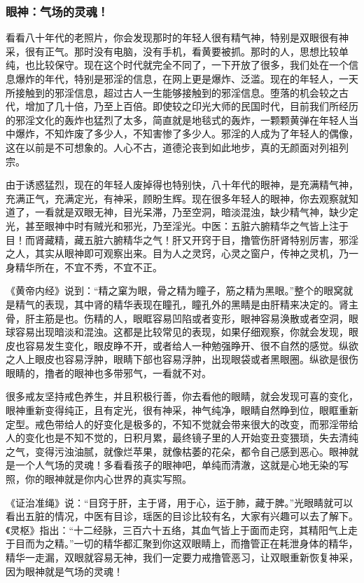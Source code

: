 \documentclass{ctexart}
\begin{document}
\subsubsection{眼神：气场的灵魂！}

看看八十年代的老照片，你会发现那时的年轻人很有精气神，特别是双眼很有神采，很有正气。那时没有电脑，没有手机，看黄要被抓。那时的人，思想比较单纯，也比较保守。现在这个时代就完全不同了，一下开放了很多，我们处在一个信息爆炸的年代，特别是邪淫的信息，在网上更是爆炸、泛滥。现在的年轻人，一天所接触到的邪淫信息，超过古人一生能够接触到的邪淫信息。堕落的机会较之古代，增加了几十倍，乃至上百倍。即使较之印光大师的民国时代，目前我们所经历的邪淫文化的轰炸也猛烈了太多，简直就是地毯式的轰炸，一颗颗黄弹在年轻人当中爆炸，不知炸废了多少人，不知害惨了多少人。邪淫的人成为了年轻人的偶像，这在以前是不可想象的。人心不古，道德沦丧到如此地步，真的无颜面对列祖列宗。

由于诱惑猛烈，现在的年轻人废掉得也特别快，八十年代的眼神，是充满精气神，充满正气，充满定光，有神采，顾盼生辉。现在很多年轻人的眼神，你去观察就知道了，一看就是双眼无神，目光呆滞，乃至空洞，暗淡混浊，缺少精气神，缺少定光，甚至眼神中时有贼光和邪光，乃至淫光。中医：五脏六腑精华之气皆上注于目！而肾藏精，藏五脏六腑精华之气！肝又开窍于目，撸管伤肝肾特别厉害，邪淫之人，其实从眼神即可观察出来。目为人之灵窍，心灵之窗户，传神之灵机，乃一身精华所在，不宜不秀，不宜不正。

《黄帝内经》说到：“精之窠为眼，骨之精为瞳子，筋之精为黑眼。”整个的眼窝就是精气的表现，其中肾的精华表现在瞳孔，瞳孔外的黑睛是由肝精来决定的。肾主骨，肝主筋是也。伤精的人，眼眶容易凹陷或者变形，眼神容易涣散或者空洞，眼球容易出现暗淡和混浊。这都是比较常见的表现，如果仔细观察，你就会发现，眼皮也容易发生变化，眼皮睁不开，或者给人一种勉强睁开、很不自然的感觉。纵欲之人上眼皮也容易浮肿，眼睛下部也容易浮肿，出现眼袋或者黑眼圈。纵欲是很伤眼睛的，撸者的眼神也多带邪气，一看就不对。

很多戒友坚持戒色养生，并且积极行善，你去看他的眼睛，就会发现可喜的变化，眼神重新变得纯正，且有定光，很有神采，神气纯净，眼睛自然睁到位，眼眶重新定型。戒色带给人的好变化是极多的，不知不觉就会带来很大的改变，而邪淫带给人的变化也是不知不觉的，日积月累，最终镜子里的人开始变丑变猥琐，失去清纯之气，变得污浊油腻，就像烂苹果，就像枯萎的花朵，都令自己感到恶心。眼神就是一个人气场的灵魂！多看看孩子的眼神吧，单纯而清澈，这就是心地无染的写照，你的眼神就是你内心世界的真实写照。

《证治准绳》说：“目窍于肝，主于肾，用于心，运于肺，藏于脾。”光眼睛就可以看出五脏的情况，中医有目诊，瑶医的目诊比较有名，大家有兴趣可以去了解下。《灵枢》指出：“十二经脉，三百六十五络，其血气皆上于面而走窍，其精阳气上走于目而为之精。”一切的精华都汇聚到你这双眼睛上，而撸管正在耗泄身体的精华，精华一走漏，双眼就容易无神，我们一定要力戒撸管恶习，让双眼重新恢复神采，因为眼神就是气场的灵魂！
\end{document}
